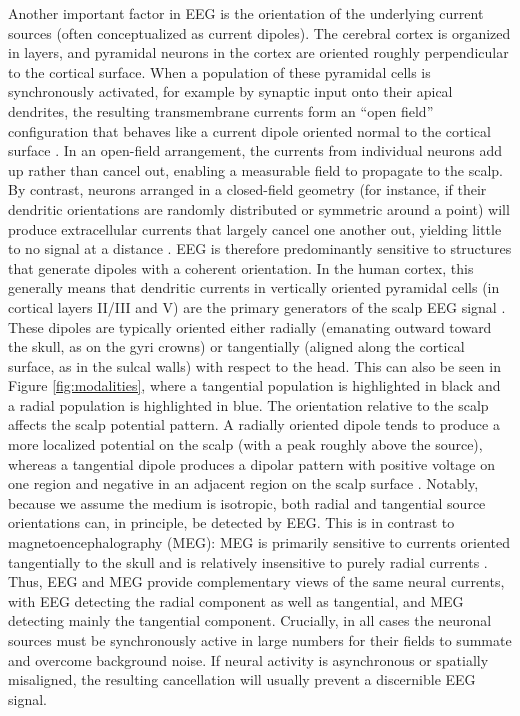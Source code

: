 \documentclass[final, a4paper,masters,en,listoffigures,listoftables,norwegiandates]{NMBU}
\begin{document}
Another important factor in EEG is the orientation of the underlying current sources (often conceptualized as current dipoles). The cerebral cortex is organized in layers, and pyramidal neurons in the cortex are oriented roughly perpendicular to the cortical surface. When a population of these pyramidal cells is synchronously activated, for example by synaptic input onto their apical dendrites, the resulting transmembrane currents form an “open field” configuration that behaves like a current dipole oriented normal to the cortical surface \cite{Buzsaki2012}. In an open-field arrangement, the currents from individual neurons add up rather than cancel out, enabling a measurable field to propagate to the scalp. By contrast, neurons arranged in a closed-field geometry (for instance, if their dendritic orientations are randomly distributed or symmetric around a point) will produce extracellular currents that largely cancel one another out, yielding little to no signal at a distance \cite{kandel2021principles}. EEG is therefore predominantly sensitive to structures that generate dipoles with a coherent orientation. In the human cortex, this generally means that dendritic currents in vertically oriented pyramidal cells (in cortical layers II/III and V) are the primary generators of the scalp EEG signal \cite{BIASIUCCI2019R80}. These dipoles are typically oriented either radially (emanating outward toward the skull, as on the gyri crowns) or tangentially (aligned along the cortical surface, as in the sulcal walls) with respect to the head. This can also be seen in Figure \ref{fig:modalities}, where a tangential population is highlighted in black and a radial population is highlighted in blue. The orientation relative to the scalp affects the scalp potential pattern. A radially oriented dipole tends to produce a more localized potential on the scalp (with a peak roughly above the source), whereas a tangential dipole produces a dipolar pattern with positive voltage on one region and negative in an adjacent region on the scalp surface \cite{Nunez2006}. Notably, because we assume the medium is isotropic, both radial and tangential source orientations can, in principle, be detected by EEG. This is in contrast to magnetoencephalography (MEG): MEG is primarily sensitive to currents oriented tangentially to the skull and is relatively insensitive to purely radial currents \cite{Baillet2001}. Thus, EEG and MEG provide complementary views of the same neural currents, with EEG detecting the radial component as well as tangential, and MEG detecting mainly the tangential component. Crucially, in all cases the neuronal sources must be synchronously active in large numbers for their fields to summate and overcome background noise. If neural activity is asynchronous or spatially misaligned, the resulting cancellation will usually prevent a discernible EEG signal.
\end{document}
